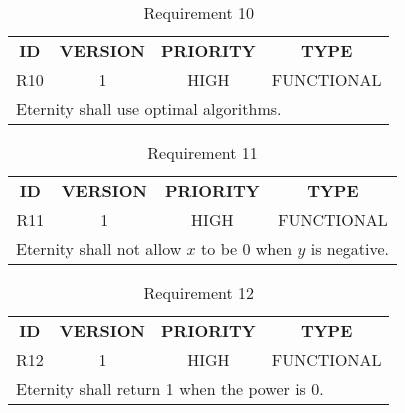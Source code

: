 \documentclass[11pt,a4paper]{report}
\theoremstyle{definition}
\theoremstyle{remark}
\begin{document}
            \begin{table}[ht]
            \centering
                \begin{tabular}{cccc} %
                    \textbf{ID} & \textbf{VERSION} & \textbf{PRIORITY} & \textbf{TYPE}\\
                            R10  &           1      &           HIGH    &      FUNCTIONAL\\
                    \hline
                    \multicolumn{4}{l}{Eternity shall use optimal algorithms.}
                \end{tabular}
                \caption{Requirement 10}
                \label{tab:table-requirements-10}
            \end{table}
            \vspace{3em}
            
            \begin{table}[ht]
            \centering
                \begin{tabular}{cccc} %
                    \textbf{ID} & \textbf{VERSION} & \textbf{PRIORITY} & \textbf{TYPE}\\
                            R11  &           1      &           HIGH    &      FUNCTIONAL\\
                    \hline
                    \multicolumn{4}{l}{Eternity shall not allow $x$ to be 0 when $y$ is negative.}
                \end{tabular}
                \caption{Requirement 11}
                \label{tab:table-requirements-11}
            \end{table}
            \vspace{3em}
            
            \begin{table}[ht]
            \centering
                \begin{tabular}{cccc} %
                    \textbf{ID} & \textbf{VERSION} & \textbf{PRIORITY} & \textbf{TYPE}\\
                            R12  &           1      &           HIGH    &      FUNCTIONAL\\
                    \hline
                    \multicolumn{4}{l}{Eternity shall return 1 when the power is 0.}
                \end{tabular}
                \caption{Requirement 12}
                \label{tab:table-requirements-12}
            \end{table}
            \vspace{3em}
            
\end{document}
